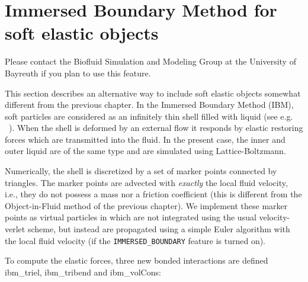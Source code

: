 %  
%   
%  
%  
%

\chapter{Immersed Boundary Method for soft elastic objects}
\label{sec:ibm}

\begin{citebox}
  Please contact the Biofluid Simulation and Modeling Group at the University of Bayreuth if you plan to use this feature.
\end{citebox}

This section describes an alternative way to include soft elastic objects somewhat different from the previous chapter. In the Immersed Boundary Method (IBM), soft particles are considered as an infinitely thin shell filled with liquid (see e.g. ~\cite{Peskin2002, Crowl2010, KruegerThesis}). When the shell is deformed by an external flow it responds by elastic restoring forces which are transmitted into the fluid. In the present case, the inner and outer liquid are of the same type and are simulated using Lattice-Boltzmann. 

Numerically, the shell is discretized by a set of marker points connected by triangles. The marker points are advected with \emph{exactly} the local fluid velocity, i.e., they do not possess a mass nor a friction coefficient (this is different from the Object-in-Fluid method of the previous chapter). We implement these marker points as virtual particles in \es which are not integrated using the usual velocity-verlet scheme, but instead are propagated using a simple Euler algorithm with the local fluid velocity (if the \texttt{IMMERSED_BOUNDARY} feature is turned on).

To compute the elastic forces, three new bonded interactions are defined ibm\_triel, ibm\_tribend and ibm\_volCons:

